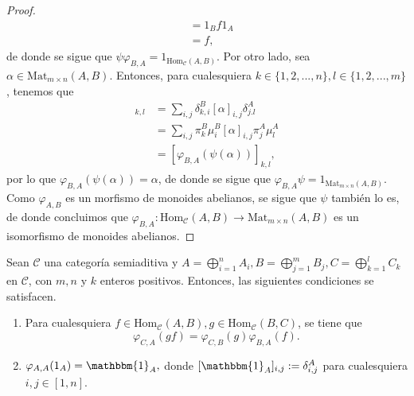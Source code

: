 \documentclass[tesis]{subfiles}
\begin{document}
\begin{proof}
\begin{align*}
                               &= 1_B f 1_A \\
                               &= f, 
    \end{align*}
    de donde se sigue que $\psi\varphi_{B,A}=1_{\text{Hom}_\mathscr{C}(A,B)}$. Por otro lado, sea $\alpha\in \text{Mat}_{m\times n}(A,B)$. Entonces, para cualesquiera $k\in\{1,2,...,n\}, l\in\{1,2,...,m\}$, tenemos que
    \begin{align*}
        [\alpha]_{k,l} &= \sum_{i,j} \delta_{k,i}^B [\alpha]_{i,j} \delta_{j.l}^A \\
                       &= \sum_{i,j} \pi_k^B\mu_i^B [\alpha]_{i,j} \pi_j^A\mu_l^A \\
                       &= [\varphi_{B,A}(\psi(\alpha))]_{k,l},
    \end{align*}
    por lo que $\varphi_{B,A}(\psi(\alpha))=\alpha$, de donde se sigue que $\varphi_{B,A}\psi=1_{ \text{Mat}_{m\times n}(A,B)}$. Como $\varphi_{A,B}$ es un morfismo de monoides abelianos, se sigue que $\psi$ también lo es, de donde concluimos que $\varphi_{B,A}:\text{Hom}_\mathscr{C}(A,B)\to \text{Mat}_{m\times n}(A,B)$ es un isomorfismo de monoides abelianos.
\end{proof}

\begin{Prop}\label{Mendoza-1.9.6}
    Sean $\mathscr{C}$ una categoría semiaditiva y $A=\bigoplus_{i=1}^n A_i, B=\bigoplus_{j=1}^m B_j, C=\bigoplus_{k=1}^l C_k$ en $\mathscr{C}$, con $m,n$ y $k$ enteros positivos. Entonces, las siguientes condiciones se satisfacen.

    \begin{enumerate}[label=(\alph*)]
    
        \item Para cualesquiera $f\in\text{Hom}_\mathscr{C}(A,B), g\in\text{Hom}_\mathscr{C}(B,C)$, se tiene que
            \[
                \varphi_{C,A}(gf) = \varphi_{C,B}(g) \varphi_{B,A}(f).
            \] 

        \item $\varphi_{A,A} (1_A) = \mathbbm{1}_A,$ donde $[\mathbbm{1}_A]_{i,j}:=\delta_{i,j}^A$ para cualesquiera $i,j\in[1,n]$.
    \end{enumerate}
\end{Prop}
\end{document}
